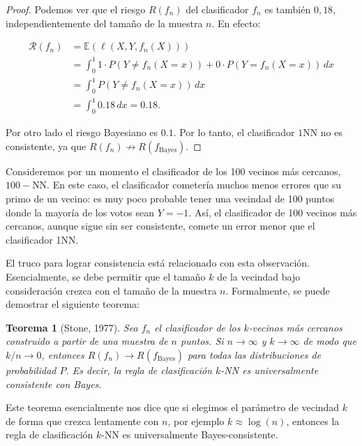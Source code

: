 \documentclass{report}
\newtheorem{thm}{Teorema}[section]
\begin{document}
\begin{proof}
Podemos ver que el riesgo \(R(f_n)\) del clasificador \(f_n\) es también $0,18$,
independientemente del tamaño de la muestra $n$. En efecto:

\[
\begin{aligned}
    \mathcal{R}(f_n) & = \mathbb{E}(\ell(X,Y,f_n(X))) \\
    & = \int_{0}^{1} 1\cdot P(Y \neq f_n(X=x)) + 0 \cdot P(Y = f_n(X=x)) \, dx \\
    & = \int_{0}^{1} P(Y \neq f_n(X=x)) \, dx \\
    & = \int_{0}^{1} 0.18 \, dx = 0.18.
\end{aligned}
\]

Por otro lado el riesgo Bayesiano es $0.1$. Por lo tanto, el clasificador $1$NN no es consistente, ya que 
\(R(f_n) \not\to R(f_{\text{Bayes}})\).\newline
\end{proof}

Consideremos por un momento el clasificador de los 100 vecinos 
más cercanos, $100-$NN. En este caso, el clasificador cometería muchos menos errores que su primo de un vecino: 
es muy poco probable tener una vecindad de 100 puntos donde la mayoría de los votos sean \(Y = -1\). 
Así, el clasificador de 100 vecinos más cercanos, aunque sigue sin ser consistente, comete un error 
menor que el clasificador 1NN.\newline

El truco para lograr consistencia está relacionado con esta observación. Esencialmente, se debe permitir 
que el tamaño \(k\) de la vecindad bajo consideración crezca con el tamaño de la muestra \(n\). Formalmente, 
se puede demostrar el siguiente teorema:\newline


\begin{thm}[Stone, 1977]
Sea \(f_n\) el clasificador de los \(k\)-vecinos más cercanos construido 
a partir de una muestra de \(n\) puntos. Si \(n \to \infty\) y \(k \to \infty\) de modo que \(k/n \to 0\), 
entonces \(R(f_n) \to R(f_{\text{Bayes}})\) para todas las distribuciones de probabilidad \(P\). 
Es decir, la regla de clasificación \(k\)-NN es universalmente consistente con Bayes.\newline
\end{thm}

Este teorema esencialmente nos dice que si elegimos el parámetro de vecindad \(k\) de forma que crezca 
lentamente con \(n\), por ejemplo \(k \approx \log(n)\), entonces la regla de clasificación \(k\)-NN es 
universalmente Bayes-consistente.\newline
\end{document}
